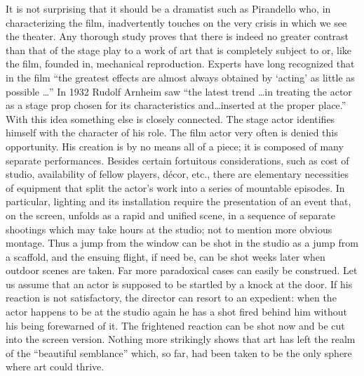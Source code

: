 \documentclass[11pt, letterpaper]{article}
\begin{document}
It is not surprising that it should be a dramatist such as Pirandello who, in
characterizing the film, inadvertently touches on the very crisis in which we
see the theater. Any thorough study proves that there is indeed no greater
contrast than that of the stage play to a work of art that is completely
subject to or, like the film, founded in, mechanical reproduction. Experts have
long recognized that in the film “the greatest effects are almost always
obtained by ‘acting’ as little as possible \ldots ” In 1932 Rudolf Arnheim saw
“the latest trend \ldots in treating the actor as a stage prop chosen for its
characteristics and\ldots inserted at the proper place.” With this idea something
else is closely connected. The stage actor identifies himself with the
character of his role. The film actor very often is denied this opportunity.
His creation is by no means all of a piece; it is composed of many separate
performances. Besides certain fortuitous considerations, such as cost of
studio, availability of fellow players, décor, etc., there are elementary
necessities of equipment that split the actor’s work into a series of mountable
episodes. In particular, lighting and its installation require the presentation
of an event that, on the screen, unfolds as a rapid and unified scene, in a
sequence of separate shootings which may take hours at the studio; not to
mention more obvious montage. Thus a jump from the window can be shot in the
studio as a jump from a scaffold, and the ensuing flight, if need be, can be
shot weeks later when outdoor scenes are taken. Far more paradoxical cases can
easily be construed. Let us assume that an actor is supposed to be startled by
a knock at the door. If his reaction is not satisfactory, the director can
resort to an expedient: when the actor happens to be at the studio again he has
a shot fired behind him without his being forewarned of it. The frightened
reaction can be shot now and be cut into the screen version. Nothing more
strikingly shows that art has left the realm of the “beautiful semblance”
which, so far, had been taken to be the only sphere where art could thrive.

\section{}
\end{document}
